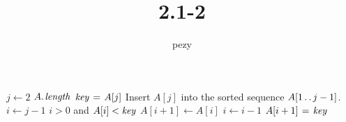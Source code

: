 \documentclass{article}
\begin{document}
	\title{2.1-2}
	\author{pezy}
	\maketitle
	\begin{codebox}
	\li \For $j \gets 2$ \To $\attrib{A}{length}$
	\li		\Do	
				$\id{key} \gets A[j]$
	\li			\Comment Insert $A[j]$ into the sorted sequence $A[1 \mathinner{\ldotp\ldotp} j-1]$.
	\li			$i \gets j-1$
	\li			\While $i > 0$ and $A[i] < \id{key}$
	\li				\Do
						$A[i+1] \gets A[i]$
	\li					$i \gets i-1$
					\End
	\li			$A[i+1] \gets \id{key}$
			\End				
	\end{codebox}
\end{document}
